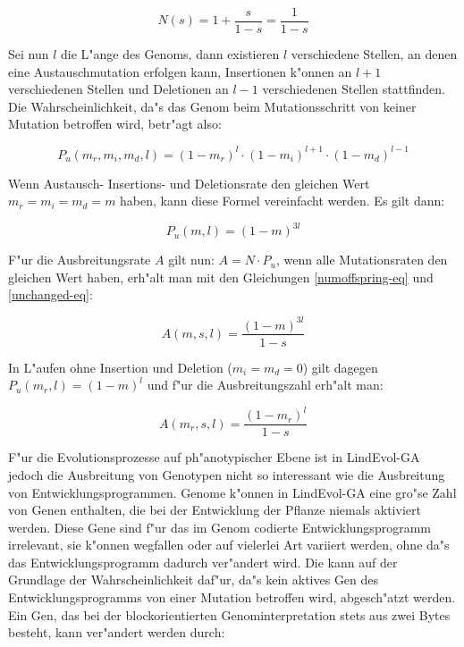 \begin{equation}
\label{numoffspring-eq}
N(s) = 1 + \frac{s}{1-s} = \frac{1}{1-s}
\end{equation}

Sei nun $l$ die L"ange des Genoms, dann existieren $l$ verschiedene Stellen, an denen eine
Austauschmutation erfolgen kann, Insertionen k"onnen an $l+1$ verschiedenen Stellen und
Deletionen an $l-1$ verschiedenen Stellen stattfinden. Die Wahrscheinlichkeit, da"s das Genom
beim Mutationsschritt von keiner Mutation betroffen wird, betr"agt also:

\begin{equation}
P_u(m_r, m_i, m_d, l) = (1-m_r)^l \cdot (1-m_i)^{l+1} \cdot (1-m_d)^{l-1}
\end{equation}

Wenn Austausch- Insertions- und Deletionsrate den gleichen Wert $m_r = m_i = m_d = m$ haben,
kann diese Formel vereinfacht werden. Es gilt dann:

\begin{equation}
\label{unchanged-eq}
P_u(m, l) = (1-m)^{3l}
\end{equation}

F"ur die Ausbreitungsrate $A$ gilt nun: $A = N \cdot P_u$, wenn alle Mutationsraten den gleichen
Wert haben, erh"alt man mit den Gleichungen \ref{numoffspring-eq} und \ref{unchanged-eq}:

\begin{equation}
\label{genomespreadm-eq}
A(m, s, l) = \frac{(1-m)^{3l}}{1-s}
\end{equation}

In L"aufen ohne Insertion und Deletion ($m_i = m_d = 0$) gilt dagegen $P_u(m_r, l) = (1-m)^l$
und f"ur die Ausbreitungszahl erh"alt man:

\begin{equation}
\label{genomespreadr-eq}
A(m_r, s, l) = \frac{(1-m_r)^l}{1-s}
\end{equation}

F"ur die Evolutionsprozesse auf ph"anotypischer Ebene ist in LindEvol-GA jedoch die Ausbreitung
von Genotypen nicht so interessant wie die Ausbreitung von Entwicklungsprogrammen.
Genome k"onnen in LindEvol-GA eine gro"se Zahl von Genen enthalten, die bei der Entwicklung
der Pflanze niemals aktiviert werden. Diese Gene sind f"ur das im Genom codierte
Entwicklungsprogramm irrelevant, sie k"onnen wegfallen oder auf vielerlei Art variiert
werden, ohne da"s das Entwicklungsprogramm dadurch ver"andert wird. Die
 kann auf der Grundlage der Wahrscheinlichkeit daf"ur,
da"s kein aktives Gen des Entwicklungsprogramms von einer Mutation betroffen wird,
abgesch"atzt werden. Ein Gen, das bei der blockorientierten Genominterpretation stets aus
zwei Bytes besteht, kann ver"andert werden durch:

